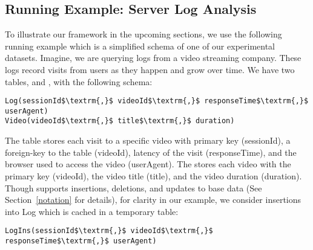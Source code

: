 \subsection{Running Example: Server Log Analysis}
To illustrate our framework in the upcoming sections, we use the following running example which is a 
simplified schema of one of our experimental datasets.
Imagine, we are querying logs from a video streaming company. 
These logs record visits from users as they happen and grow over time.
We have two tables,  and , with the following schema:
\begin{lstlisting}[mathescape,basicstyle={\scriptsize}]
Log(sessionId$\textrm{,}$ videoId$\textrm{,}$ responseTime$\textrm{,}$ userAgent)
Video(videoId$\textrm{,}$ title$\textrm{,}$ duration)
\end{lstlisting}
The  table stores each visit to a specific video with primary key (\textsf{sessionId}), a foreign-key to the  table (\textsf{videoId}), latency of the visit (\textsf{responseTime}), and the browser used to access the video (\textsf{userAgent}).
The  stores each video with the primary key (\textsf{videoId}), the video title (\textsf{title}), and the video duration (\textsf{duration}).
Though \svc supports insertions, deletions, and updates to base data (See Section~\ref{notation} for details), for clarity in our example, we consider insertions
into Log which is cached in a temporary table:
\begin{lstlisting}[mathescape,basicstyle={\scriptsize}]
LogIns(sessionId$\textrm{,}$ videoId$\textrm{,}$ responseTime$\textrm{,}$ userAgent)
\end{lstlisting}




